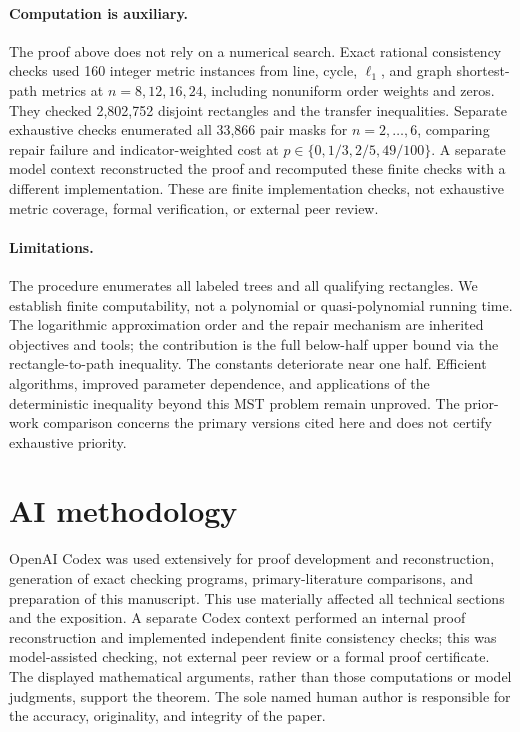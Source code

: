 \documentclass[acmlarge,screen,nonacm,11pt]{acmart}
\begin{document}
\paragraph{Computation is auxiliary.}
The proof above does not rely on a numerical search. Exact rational consistency checks used 160 integer metric instances from line, cycle, $\ell_1$, and graph shortest-path metrics at $n=8,12,16,24$, including nonuniform order weights and zeros. They checked 2,802,752 disjoint rectangles and the transfer inequalities. Separate exhaustive checks enumerated all 33,866 pair masks for $n=2,\ldots,6$, comparing repair failure and indicator-weighted cost at $p\in\{0,1/3,2/5,49/100\}$. A separate model context reconstructed the proof and recomputed these finite checks with a different implementation. These are finite implementation checks, not exhaustive metric coverage, formal verification, or external peer review.

\paragraph{Limitations.}
The procedure enumerates all labeled trees and all qualifying rectangles. We establish finite computability, not a polynomial or quasi-polynomial running time. The logarithmic approximation order and the repair mechanism are inherited objectives and tools; the contribution is the full below-half upper bound via the rectangle-to-path inequality. The constants deteriorate near one half. Efficient algorithms, improved parameter dependence, and applications of the deterministic inequality beyond this MST problem remain unproved. The prior-work comparison concerns the primary versions cited here and does not certify exhaustive priority.

\section*{AI methodology}
OpenAI Codex was used extensively for proof development and reconstruction, generation of exact checking programs, primary-literature comparisons, and preparation of this manuscript. This use materially affected all technical sections and the exposition. A separate Codex context performed an internal proof reconstruction and implemented independent finite consistency checks; this was model-assisted checking, not external peer review or a formal proof certificate. The displayed mathematical arguments, rather than those computations or model judgments, support the theorem. The sole named human author is responsible for the accuracy, originality, and integrity of the paper.



\end{document}
